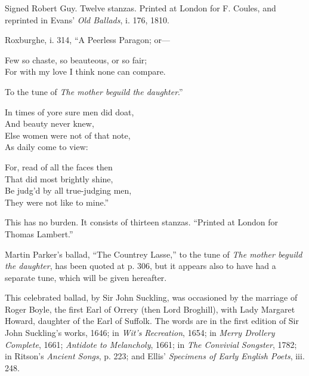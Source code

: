 \pagebreak

\noindent Signed Robert Guy. Twelve stanzas. Printed at London for F. Coules, and
reprinted in Evans’ \textit{Old Ballads}, i. 176, 1810.

Roxburghe, i. 314, “A Peerless Paragon; or—
\settowidth{\versewidth}{Few so chaste, so beauteous, or so fair;}
\begin{scverse}
Few so chaste, so beauteous, or so fair;\\
For with my love I think none can compare.
\end{scverse}
To the tune of \textit{The mother beguild the daughter}.”
\settowidth{\versewidth}{In times of yore sure men did doat,}
\begin{dcverse}\begin{altverse}
In times of yore sure men did doat,\\
And beauty never knew,\\
Else women were not of that note,\\
As daily come to view:
\end{altverse}

\begin{altverse}
For, read of all the faces then\\
That did most brightly shine,\\
Be judg’d by all true-judging men,\\
They were not like to mine.”
\end{altverse}
\end{dcverse}
This has no burden. It consists of thirteen stanzas. “Printed at London for
Thomas Lambert.”

Martin Parker’s ballad, “The Countrey Lasse,” to the tune of \textit{The mother
beguild the daughter}, has been quoted at p. 306, but it appears also to have had a
separate tune, which will be given hereafter.



\pagebreak


This celebrated ballad, by Sir John Suckling, was occasioned by the marriage
of Roger Boyle, the first Earl of Orrery (then Lord Broghill), with Lady
Margaret Howard, daughter of the Earl of Suffolk. The words are in the first
edition of Sir John Suckling’s works, 1646; in \textit{Wit’s Recreation}, 1654; in
\textit{Merry Drollery Complete}, 1661; \textit{Antidote to Melancholy}, 1661; in\textit{ The Convivial
Songster}, 1782; in Ritson’s \textit{Ancient Songs}, p. 223; and Ellis’ \textit{Specimens of Early
English Poets}, iii. 248.

